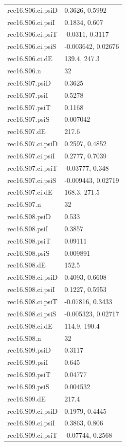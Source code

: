 {\begin{longtable}{p{}p{}}
{}rec16.S06.ci.psiD & 0.3626, 0.5992\\
{}rec16.S06.ci.psiI & 0.1834, 0.607\\
{}rec16.S06.ci.psiT & -0.0311, 0.3117\\
{}rec16.S06.ci.psiS & -0.003642, 0.02676\\
{}rec16.S06.ci.dE & 139.4, 247.3\\
{}rec16.S06.n & 32\\
{}rec16.S07.psiD & 0.3625\\
{}rec16.S07.psiI & 0.5278\\
{}rec16.S07.psiT & 0.1168\\
{}rec16.S07.psiS & 0.007042\\
{}rec16.S07.dE & 217.6\\
{}rec16.S07.ci.psiD & 0.2597, 0.4852\\
{}rec16.S07.ci.psiI & 0.2777, 0.7039\\
{}rec16.S07.ci.psiT & -0.03777, 0.348\\
{}rec16.S07.ci.psiS & -0.009443, 0.02719\\
{}rec16.S07.ci.dE & 168.3, 271.5\\
{}rec16.S07.n & 32\\
{}rec16.S08.psiD & 0.533\\
{}rec16.S08.psiI & 0.3857\\
{}rec16.S08.psiT & 0.09111\\
{}rec16.S08.psiS & 0.009891\\
{}rec16.S08.dE & 152.5\\
{}rec16.S08.ci.psiD & 0.4093, 0.6608\\
{}rec16.S08.ci.psiI & 0.1227, 0.5953\\
{}rec16.S08.ci.psiT & -0.07816, 0.3433\\
{}rec16.S08.ci.psiS & -0.005323, 0.02717\\
{}rec16.S08.ci.dE & 114.9, 190.4\\
{}rec16.S08.n & 32\\
{}rec16.S09.psiD & 0.3117\\
{}rec16.S09.psiI & 0.645\\
{}rec16.S09.psiT & 0.04777\\
{}rec16.S09.psiS & 0.004532\\
{}rec16.S09.dE & 217.4\\
{}rec16.S09.ci.psiD & 0.1979, 0.4445\\
{}rec16.S09.ci.psiI & 0.3863, 0.806\\
{}rec16.S09.ci.psiT & -0.07744, 0.2568\\

\end{longtable}}
